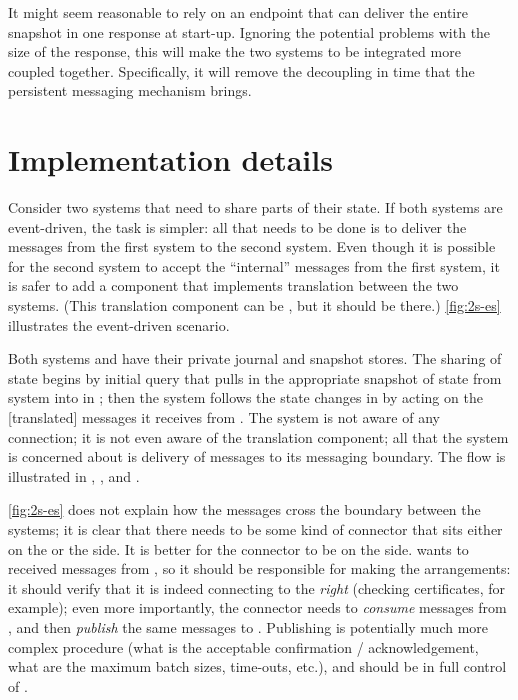 It might seem reasonable to rely on an endpoint that can deliver the entire snapshot in one response at start-up. Ignoring the potential problems with the size of the response, this will make the two systems to be integrated more coupled together. Specifically, it will remove the decoupling in time that the persistent messaging mechanism brings. 


\section{Implementation details}
Consider two systems that need to share parts of their state. If both systems are event-driven, the task is simpler: all that needs to be done is to deliver the messages from the first system to the second system. Even though it is possible for the second system to accept the ``internal'' messages from the first system, it is safer to add a component that implements translation between the two systems. (This translation component can be , but it should be there.) \autoref{fig:2s-es} illustrates the event-driven scenario.


Both systems  and  have their private journal and snapshot stores. The sharing of state begins by initial query that pulls in the appropriate snapshot of state from system  into  in ; then the system  follows the state changes in  by acting on the [translated] messages it receives from . The system  is not aware of any connection; it is not even aware of the translation component; all that the system  is concerned about is delivery of messages to its messaging boundary. The flow is illustrated in , , and .

\autoref{fig:2s-es} does not explain how the messages cross the boundary between the systems; it is clear that there needs to be some kind of connector that sits either on the  or the  side. It is better for the connector to be on the  side.  wants to received messages from , so it should be responsible for making the arrangements: it should verify that it is indeed connecting to the \emph{right}  (checking certificates, for example); even more importantly, the connector needs to \emph{consume} messages from , and then \emph{publish} the same messages to . Publishing is potentially much more complex procedure (what is the acceptable confirmation / acknowledgement, what are the maximum batch sizes, time-outs, etc.), and should be in full control of \cite{mirrormaker}.  

